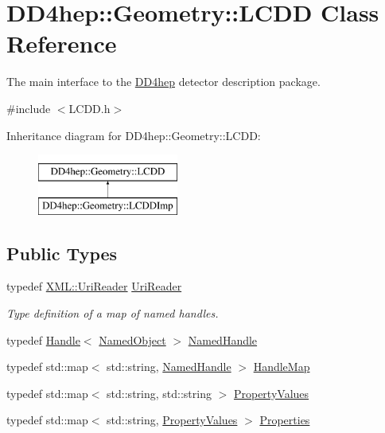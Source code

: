 \hypertarget{class_d_d4hep_1_1_geometry_1_1_l_c_d_d}{}\section{D\+D4hep\+:\+:Geometry\+:\+:L\+C\+DD Class Reference}
\label{class_d_d4hep_1_1_geometry_1_1_l_c_d_d}


The main interface to the \hyperlink{namespace_d_d4hep}{D\+D4hep} detector description package.  




{\ttfamily \#include $<$L\+C\+D\+D.\+h$>$}

Inheritance diagram for D\+D4hep\+:\+:Geometry\+:\+:L\+C\+DD\+:\begin{figure}[H]
\begin{center}
\leavevmode
\includegraphics[height=2.000000cm]{class_d_d4hep_1_1_geometry_1_1_l_c_d_d}
\end{center}
\end{figure}
\subsection*{Public Types}
\begin{DoxyCompactItemize}
\item 
typedef \hyperlink{class_d_d4hep_1_1_x_m_l_1_1_uri_reader}{X\+M\+L\+::\+Uri\+Reader} \hyperlink{class_d_d4hep_1_1_geometry_1_1_l_c_d_d_a69f1e3e4fbcef1d57f1df1c2bd85918f}{Uri\+Reader}
\begin{DoxyCompactList}\small\item\em Type definition of a map of named handles. \end{DoxyCompactList}\item 
typedef \hyperlink{class_d_d4hep_1_1_handle}{Handle}$<$ \hyperlink{class_d_d4hep_1_1_named_object}{Named\+Object} $>$ \hyperlink{class_d_d4hep_1_1_geometry_1_1_l_c_d_d_a5502368683a5c78c91e9f814ff72b705}{Named\+Handle}
\item 
typedef std\+::map$<$ std\+::string, \hyperlink{class_d_d4hep_1_1_geometry_1_1_l_c_d_d_a5502368683a5c78c91e9f814ff72b705}{Named\+Handle} $>$ \hyperlink{class_d_d4hep_1_1_geometry_1_1_l_c_d_d_a05cb11e7355772c7b0794bcca59bf477}{Handle\+Map}
\item 
typedef std\+::map$<$ std\+::string, std\+::string $>$ \hyperlink{class_d_d4hep_1_1_geometry_1_1_l_c_d_d_a2a0388e0d76c73a3582439953ac3be53}{Property\+Values}
\item 
typedef std\+::map$<$ std\+::string, \hyperlink{class_d_d4hep_1_1_geometry_1_1_l_c_d_d_a2a0388e0d76c73a3582439953ac3be53}{Property\+Values} $>$ \hyperlink{class_d_d4hep_1_1_geometry_1_1_l_c_d_d_a89096744868821bf5dcb0c0560b348c9}{Properties}
\end{DoxyCompactItemize}
